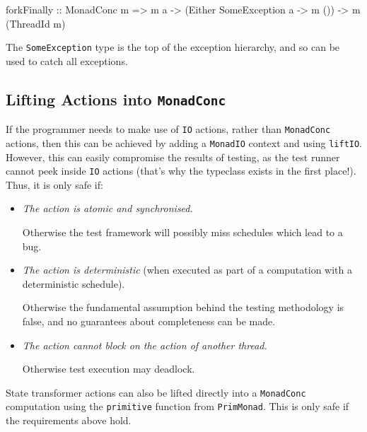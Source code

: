 \begin{haskellcode}
forkFinally :: MonadConc m => m a
  -> (Either SomeException a -> m ()) -> m (ThreadId m)
\end{haskellcode}

The \verb|SomeException| type is the top of the exception hierarchy,
and so can be used to catch all exceptions.

\subsection{Lifting Actions into \texttt{MonadConc}}
\label{sec:abstraction-typeclass-lifting}

If the programmer needs to make use of \verb|IO| actions, rather than
\verb|MonadConc| actions, then this can be achieved by adding a
\verb|MonadIO| context and using \verb|liftIO|. However, this can
easily compromise the results of testing, as the test runner cannot
peek inside \verb|IO| actions (that's why the typeclass exists in the
first place!). Thus, it is only safe if:

\begin{itemize}
\item \emph{The action is atomic and synchronised.}

  Otherwise the test framework will possibly miss schedules which lead
  to a bug.
\item \emph{The action is deterministic} (when executed as part of a
  computation with a deterministic schedule).

  Otherwise the fundamental assumption behind the testing methodology
  is false, and no guarantees about completeness can be made.
\item \emph{The action cannot block on the action of another thread.}

  Otherwise test execution may deadlock.
\end{itemize}

State transformer actions can also be lifted directly into a
\verb|MonadConc| computation using the \verb|primitive| function from
\verb|PrimMonad|. This is only safe if the requirements above hold.
